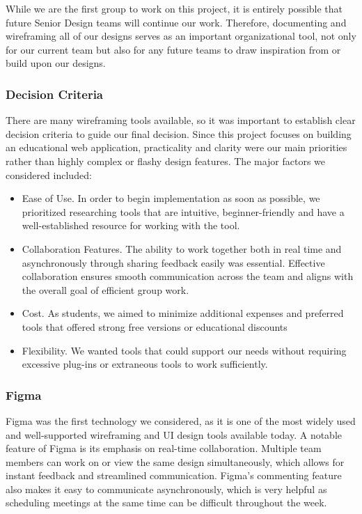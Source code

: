 \documentclass[12pt]{article}
\begin{document}
While we are the first group to work on this project, it is entirely possible that future Senior Design teams will continue our work. Therefore, documenting and wireframing all of our designs serves as an important organizational tool, not only for our current team but also for any future teams to draw inspiration from or build upon our designs.

\subsubsection{Decision Criteria}
There are many wireframing tools available, so it was important to establish clear decision criteria to guide our final decision. Since this project focuses on building an educational web application, practicality and clarity were our main priorities rather than highly complex or flashy design features. The major factors we considered included:
\begin{itemize}
	\item Ease of Use. In order to begin implementation as soon as possible, we prioritized researching tools that are intuitive, beginner-friendly and have a well-established resource for working with the tool.
	\item Collaboration Features. The ability to work together both in real time and asynchronously through sharing feedback easily was essential. Effective collaboration ensures smooth communication across the team and aligns with the overall goal of efficient group work.
	\item Cost. As students, we aimed to minimize additional expenses and preferred tools that offered strong free versions or educational discounts
	\item Flexibility. We wanted tools that could support our needs without requiring excessive plug-ins or extraneous tools to work sufficiently.
\end{itemize}

\subsubsection{Figma}
Figma was the first technology we considered, as it is one of the most widely used and well-supported wireframing and UI design tools available today. A notable feature of Figma is its emphasis on real-time collaboration. Multiple team members can work on or view the same design simultaneously, which allows for instant feedback and streamlined communication. Figma’s commenting feature also makes it easy to communicate asynchronously, which is very helpful as scheduling meetings at the same time can be difficult throughout the week.
\end{document}
